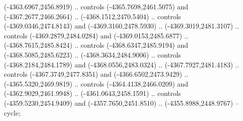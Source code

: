 \begin{scope}[shift={(430.80877,-416.69739)}]
\begin{scope}[shift={(4537.8125,-1856.4436)}]
\begin{scope}[shift={(-148.39113,-28.14259)}]
        (-4363.6967,2456.8919) .. controls (-4365.7698,2461.5075) and
        (-4367.2677,2466.2664) .. (-4368.1512,2470.5404) .. controls
        (-4369.0346,2474.8143) and (-4369.3160,2478.5930) .. (-4369.3019,2481.3107) ..
        controls (-4369.2879,2484.0284) and (-4369.0153,2485.6877) ..
        (-4368.7615,2485.8424) .. controls (-4368.6347,2485.9194) and
        (-4368.5085,2485.6223) .. (-4368.3634,2484.9006) .. controls
        (-4368.2184,2484.1789) and (-4368.0556,2483.0324) .. (-4367.7927,2481.4183) ..
        controls (-4367.3749,2477.8351) and (-4366.6502,2473.9429) ..
        (-4365.5320,2469.9819) .. controls (-4364.4138,2466.0209) and
        (-4362.9029,2461.9948) .. (-4361.0643,2458.1591) .. controls
        (-4359.5230,2454.9409) and (-4357.7650,2451.8510) .. (-4355.8988,2448.9767) --
        cycle;


\end{scope}
\end{scope}
\end{scope}
